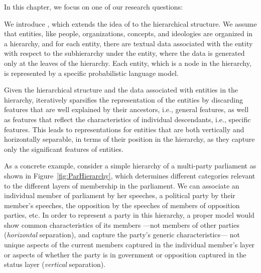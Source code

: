 In this chapter, we focus on one of our research questions:

We introduce \hswlms, which extends the idea of \swlms to the hierarchical structure. We assume that entities, like people, organizations, concepts, and ideologies are organized in a hierarchy, and for each entity, there are textual data associated with the entity with respect to the subhierarchy under the entity, where the data is generated only at the leaves of the hierarchy. Each entity, which is a node in the hierarchy, is represented by a specific probabilistic language model.

Given the hierarchical structure and the data associated with entities in the hierarchy, \achswlm iteratively sparsifies the representation of the entities by discarding features that are well explained by their ancestors, i.e., general features, as well as features that reflect the characteristics of individual descendants, i.e., specific features. This leads to representations for entities that are both vertically and horizontally separable, in terms of their position in the hierarchy, as they capture only the significant features of entities.


As a concrete example, consider a simple hierarchy of a multi-party parliament as shown in Figure~\ref{fig:ParHierarchy}, which determines different categories relevant to the different layers of membership in the parliament.  We can associate an individual member of parliament by her speeches, a political party by their member's speeches, the opposition by the speeches of members of opposition parties, etc. 
In order to represent a party in this hierarchy, a proper model would show common characteristics of its members ---not members of other parties (\emph{horizontal} separation), and capture the party's generic characteristics--- not unique aspects of the current members captured in the individual member's layer or aspects of whether the party is in government or opposition captured in the status layer (\emph{vertical} separation).

